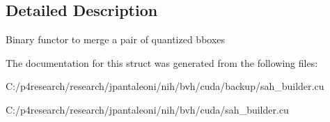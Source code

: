 \subsection{\-Detailed \-Description}
\-Binary functor to merge a pair of quantized bboxes 

\-The documentation for this struct was generated from the following files\-:\begin{DoxyCompactItemize}
\item 
\-C\-:/p4research/research/jpantaleoni/nih/bvh/cuda/backup/sah\-\_\-builder.\-cu\item 
\-C\-:/p4research/research/jpantaleoni/nih/bvh/cuda/sah\-\_\-builder.\-cu\end{DoxyCompactItemize}
